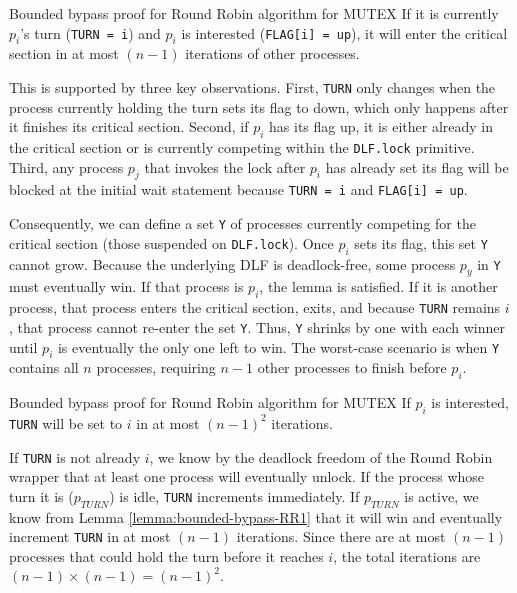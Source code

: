 \begin{Lemma}{Bounded bypass proof for Round Robin algorithm for MUTEX}{}\label{lemma:bounded-bypass-RR1}
If it is currently $p_i$'s turn (\texttt{TURN = i}) and $p_i$ is interested (\texttt{FLAG[i] = up}), it will enter the critical section in at most $(n-1)$ iterations of other processes.

\begin{demonstration}
This is supported by three key observations. First, \texttt{TURN} only changes when the process currently holding the turn sets its flag to down, which only happens after it finishes its critical section. Second, if $p_i$ has its flag up, it is either already in the critical section or is currently competing within the \texttt{DLF.lock} primitive. Third, any process $p_j$ that invokes the lock after $p_i$ has already set its flag will be blocked at the initial wait statement because \texttt{TURN = i} and \texttt{FLAG[i] = up}.

Consequently, we can define a set \texttt{Y} of processes currently competing for the critical section (those suspended on \texttt{DLF.lock}). Once $p_i$ sets its flag, this set \texttt{Y} cannot grow. Because the underlying DLF is deadlock-free, some process $p_y$ in \texttt{Y} must eventually win. If that process is $p_i$, the lemma is satisfied. If it is another process, that process enters the critical section, exits, and because \texttt{TURN} remains $i$, that process cannot re-enter the set \texttt{Y}. Thus, \texttt{Y} shrinks by one with each winner until $p_i$ is eventually the only one left to win. The worst-case scenario is when \texttt{Y} contains all $n$ processes, requiring $n-1$ other processes to finish before $p_i$.
\end{demonstration}
\end{Lemma}

\begin{Lemma}{Bounded bypass proof for Round Robin algorithm for MUTEX}{}\label{lemma:bounded-bypass-RR2}
If $p_i$ is interested, \texttt{TURN} will be set to $i$ in at most $(n-1)^2$ iterations. 

\begin{demonstration}
If \texttt{TURN} is not already $i$, we know by the deadlock freedom of the Round Robin wrapper that at least one process will eventually unlock. If the process whose turn it is ($p_{TURN}$) is idle, \texttt{TURN} increments immediately. If $p_{TURN}$ is active, we know from Lemma \ref{lemma:bounded-bypass-RR1} that it will win and eventually increment \texttt{TURN} in at most $(n-1)$ iterations. Since there are at most $(n-1)$ processes that could hold the turn before it reaches $i$, the total iterations are $(n-1)\times(n-1)=(n-1)^2$.
\end{demonstration}
\end{Lemma}

